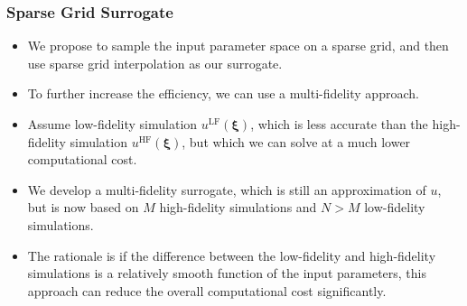 \documentclass[11pt,ucs]{beamer}
\begin{document}
\begin{frame}\frametitle{Sparse Grid Surrogate}

\begin{itemize}

\item We propose to sample the input parameter space on a sparse grid, and then use sparse grid interpolation as our surrogate. 

\item To further increase the efficiency, we can use a multi-fidelity approach. 

\item Assume low-fidelity simulation $u^\text{LF}(\boldsymbol{\xi})$, which is less accurate than the high-fidelity simulation $u^\text{HF}(\boldsymbol{\xi})$, but which we can solve at a much lower computational cost. 

\item We  develop a multi-fidelity surrogate, which is still an approximation of $u$, but is now based on $M$ high-fidelity simulations and $N>M$ low-fidelity simulations. 

\item The rationale is if the difference between the low-fidelity and high-fidelity simulations is a relatively smooth function of the input parameters, this approach can reduce the overall computational cost significantly.

\end{itemize}

\end{frame}
\end{document}
